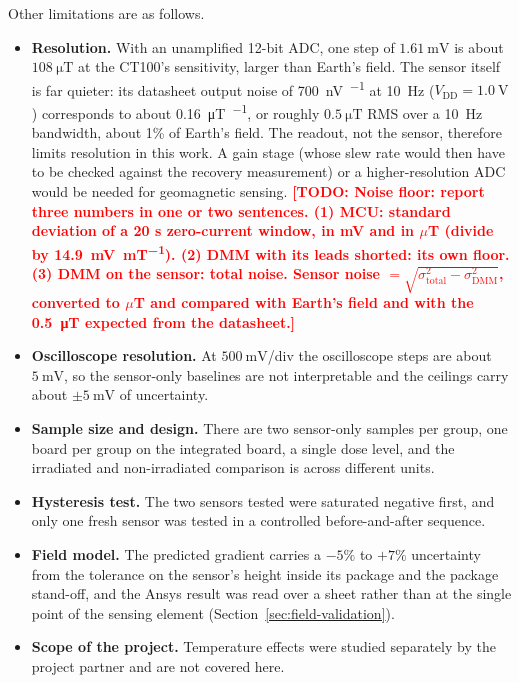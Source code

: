 \documentclass[12pt,a4paper]{article}
\newcommand{\todo}[1]{\textcolor{red}{\textbf{[TODO: #1]}}}
\begin{document}
Other limitations are as follows.
\begin{itemize}
\item \textbf{Resolution.} With an unamplified 12-bit ADC, one step of $\SI{1.61}{\milli\volt}$ is about $\SI{108}{\micro\tesla}$ at the CT100's sensitivity, larger than Earth's field. The sensor itself is far quieter: its datasheet output noise of \SI{700}{\nano\volt\per\sqrt{\hertz}} at \SI{10}{\hertz} ($V_{\text{DD}} = \SI{1.0}{\volt}$) \cite{ct100_datasheet} corresponds to about \SI{0.16}{\micro\tesla\per\sqrt{\hertz}}, or roughly $\SI{0.5}{\micro\tesla}$ RMS over a \SI{10}{\hertz} bandwidth, about 1\% of Earth's field. The readout, not the sensor, therefore limits resolution in this work. A gain stage (whose slew rate would then have to be checked against the recovery measurement) or a higher-resolution ADC would be needed for geomagnetic sensing. \todo{Noise floor: report three numbers in one or two sentences. (1) MCU: standard deviation of a 20 s zero-current window, in mV and in $\mu$T (divide by \SI{14.9}{\milli\volt\per\milli\tesla}). (2) DMM with its leads shorted: its own floor. (3) DMM on the sensor: total noise. Sensor noise $= \sqrt{\sigma_{\text{total}}^2 - \sigma_{\text{DMM}}^2}$, converted to $\mu$T and compared with Earth's field and with the \SI{0.5}{\micro\tesla} expected from the datasheet.}
\item \textbf{Oscilloscope resolution.} At $\SI{500}{\milli\volt}$/div the oscilloscope steps are about $\SI{5}{\milli\volt}$, so the sensor-only baselines are not interpretable and the ceilings carry about $\pm\SI{5}{\milli\volt}$ of uncertainty.
\item \textbf{Sample size and design.} There are two sensor-only samples per group, one board per group on the integrated board, a single dose level, and the irradiated and non-irradiated comparison is across different units.
\item \textbf{Hysteresis test.} The two sensors tested were saturated negative first, and only one fresh sensor was tested in a controlled before-and-after sequence.
\item \textbf{Field model.} The predicted gradient carries a $-5\%$ to $+7\%$ uncertainty from the tolerance on the sensor's height inside its package and the package stand-off, and the Ansys result was read over a sheet rather than at the single point of the sensing element (Section~\ref{sec:field-validation}).
\item \textbf{Scope of the project.} Temperature effects were studied separately by the project partner and are not covered here.
\end{itemize}
\end{document}
